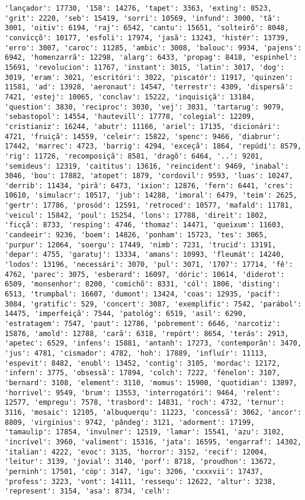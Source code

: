 \begin{Verbatim}[commandchars=\\\{\}]
'lançador': 17730, '158': 14276, 'tapet': 3363, 'exting': 8523, 'grit': 2220, 'seb': 15419, 'sorri': 10569, 'infund': 3000, 'tã': 3001, 'oitiv': 6194, 'raj': 6542, 'cantu': 15651, 'solteirõ': 8048, 'convicçõ': 10177, 'esfoli': 17974, 'jasã': 13243, 'histér': 13739, 'erro': 3007, 'caroc': 11285, 'ambic': 3008, 'balouc': 9934, 'pajens': 6942, 'homenzarrã': 12298, 'alarg': 6433, 'propag': 8418, 'espinhel': 15691, 'revolucion': 11767, 'instant': 3015, 'latin': 3017, 'dog': 3019, 'eram': 3021, 'escritóri': 3022, 'piscatór': 11917, 'quinzen': 11581, 'ad': 13928, 'aeronaut': 14547, 'terrestr': 4309, 'dispersã': 7421, 'estej': 10065, 'conclav': 15222, 'inquisiçã': 13184, 'question': 3830, 'reciproc': 3030, 'vej': 3031, 'tartarug': 9079, 'sebastopol': 14554, 'hautevill': 17778, 'colegial': 12209, 'cristianiz': 16244, 'abutr': 11166, 'ariel': 17135, 'dicionári': 4721, 'fruiçã': 14559, 'celeir': 15822, 'spenc': 9466, 'diabrur': 17442, 'marrec': 4723, 'barrig': 4294, 'exceçã': 1864, 'repúdi': 8579, 'rig': 11726, 'recomposiçã': 8581, 'dragõ': 6464, '..': 9201, 'semideus': 12319, 'caititus': 13616, 'reincident': 9469, 'inabal': 3046, 'bou': 17882, 'atopet': 1879, 'cordovil': 9593, 'luas': 10247, 'derrib': 11434, 'pirã': 6473, 'ixion': 12876, 'fern': 6441, 'cres': 10610, 'simulacr': 10517, 'jub': 14288, 'imoral': 6479, 'teim': 2625, 'gertr': 17786, 'prosód': 12591, 'retroced': 10577, 'mafald': 11781, 'veicul': 15842, 'poul': 15254, 'lons': 17788, 'direit': 1802, 'ficçã': 8733, 'resping': 4746, 'thomaz': 14471, 'queixum': 11603, 'candeeir': 9236, 'boem': 14826, 'ponham': 15723, 'tes': 3065, 'purpur': 12064, 'soergu': 17449, 'nimb': 7231, 'trucid': 13191, 'depar': 4755, 'garatuj': 13334, 'amans': 10993, 'fleumát': 14240, 'lodos': 13196, 'necessári': 3070, 'pul': 3071, '1707': 17714, 'fê': 4762, 'parec': 3075, 'esberard': 16097, 'dóric': 10614, 'diderot': 6509, 'monsenhor': 8200, 'comichõ': 8331, 'cól': 1806, 'disting': 6513, 'trumpbal': 16607, 'dumont': 13424, 'coas': 12935, 'pacíf': 3084, 'gratific': 529, 'concert': 3087, 'exemplific': 7542, 'parábol': 14475, 'imperfeiçã': 7544, 'patológ': 6519, 'asil': 6290, 'estratagem': 7547, 'paut': 12786, 'pobrement': 6646, 'narcotiz': 15876, 'amold': 12788, 'carã': 6318, 'repórt': 8654, 'terás': 2913, 'apetec': 6529, 'infens': 15881, 'antanh': 17273, 'contemporân': 3470, 'jus': 4781, 'cismador': 4782, 'hoh': 17889, 'influír': 11113, 'espevit': 8482, 'enubl': 13452, 'contig': 3105, 'mordac': 12172, 'infern': 3775, 'obsessã': 17894, 'colch': 7222, 'fénelon': 3107, 'bernard': 3108, 'element': 3110, 'momus': 15900, 'quotidian': 13897, 'horrivel': 9549, 'brum': 13553, 'interrogatóri': 9464, 'relent': 12577, 'empregu': 7578, 'trasbord': 14831, 'roch': 4732, 'ternur': 3116, 'mosaic': 12105, 'albuquerqu': 11223, 'concessã': 3062, 'ancor': 8809, 'virginius': 9742, 'pândeg': 3121, 'adorment': 17199, 'tamaulip': 17854, 'invulner': 12519, 'lamar': 15541, 'azu': 3102, 'incrível': 3960, 'valiment': 15316, 'jata': 16595, 'engarraf': 14302, 'italian': 4222, 'evoc': 3135, 'horror': 3152, 'recif': 12004, 'leitur': 3139, 'jovial': 3140, 'porf': 8718, 'proudhon': 13672, 'perninh': 17501, 'cóp': 3147, 'igu': 3206, 'cxxxvii': 17437, 'profess': 3223, 'vont': 14111, 'ressequ': 12622, 'altur': 3238, 'represent': 3154, 'asa': 8734, 'celh': 
\end{Verbatim}
